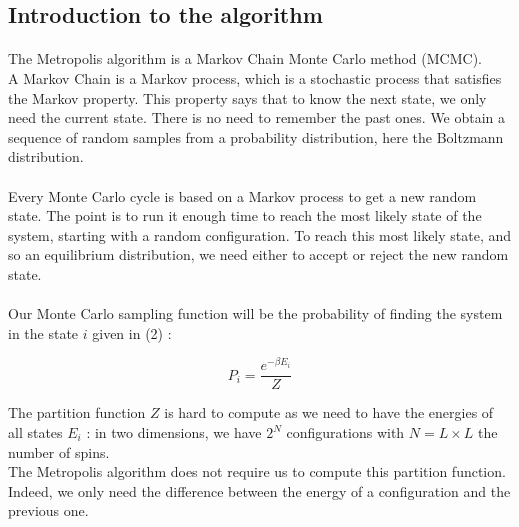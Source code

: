 \documentclass[a4paper, twoside, 11pt]{report}
\theoremstyle{theorem}
\theoremstyle{remark}
\theoremstyle{exemple}
\begin{document}
        \subsection{Introduction to the algorithm}
        
            \paragraph{}The Metropolis algorithm is a Markov Chain Monte Carlo method (MCMC).\\
            A Markov Chain is a Markov process, which is a stochastic process that satisfies the Markov property. This property says that to know the next state, we only need the current state. There is no need to remember the past ones. We obtain a sequence of random samples from a probability distribution, here the Boltzmann distribution.\\
            \paragraph{}Every Monte Carlo cycle is based on a Markov process to get a new random state. The point is to run it enough time to reach the most likely state of the system, starting with a random configuration. To reach this most likely state, and so an equilibrium distribution, we need either to accept or reject the new random state. 
            
            \paragraph{}Our Monte Carlo sampling function will be the probability of finding the system in the state $i$ given in (2) :
                    
                \begin{equation*}
                    P_i = \frac{e^{-\beta E_i}}{Z}
                \end{equation*}
                
            The partition function $Z$ is hard to compute as we need to have the energies of all states $E_i$ : in two dimensions, we have $2^N$ configurations with $N=L\times L$ the number of spins. \\
            The Metropolis algorithm does not require us to compute this partition function. Indeed, we only need the difference between the energy of a configuration and the previous one.
            
\end{document}

